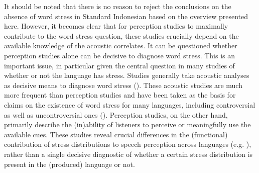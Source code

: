 It should be noted that there is no reason to reject the conclusions on the absence of word stress in Standard Indonesian based on the overview presented here. However, it becomes clear that for perception studies to maximally contribute to the word stress question, these studies crucially depend on the available knowledge of the acoustic correlates. It can be questioned whether perception studies alone can be decisive to diagnose word stress. This is an important issue, in particular given the central question in many studies of whether or not the language has stress. Studies generally take acoustic analyses as decisive means to diagnose word stress (\citealt{gordon_acoustic_2017}). These acoustic studies are much more frequent than perception studies and have been taken as the basis for claims on the existence of word stress for many languages, including controversial as well as uncontroversial ones (\citealt{gordon_acoustic_2017}). Perception studies, on the other hand, primarily describe the (in)ability of listeners to perceive or meaningfully use the available cues. These studies reveal crucial differences in the (functional) contribution of stress distributions to speech perception across languages (e.g. \citealt{peperkamp_perception_2010}), rather than a single decisive diagnostic of whether a certain stress distribution is present in the (produced) language or not. \par

